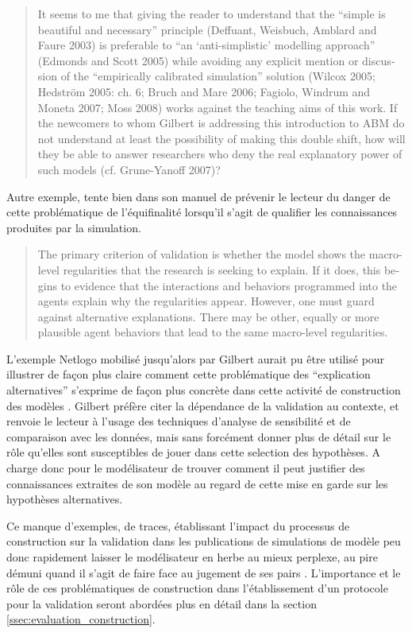 \foreignblockquote{english}[\cite{Manzo2007a}]{It seems to me that giving the reader to understand that the \enquote{simple is beautiful and necessary} principle (Deffuant, Weisbuch, Amblard and Faure 2003) is preferable to \enquote{an \enquote{anti-simplistic} modelling approach} (Edmonds and Scott 2005) while avoiding any explicit mention or discussion of the \enquote{empirically
calibrated simulation} solution (Wilcox 2005; Hedström 2005: ch. 6; Bruch and Mare 2006; Fagiolo, Windrum and Moneta 2007; Moss 2008) works against the teaching aims of this work. If the newcomers to whom Gilbert is addressing this introduction to ABM do not understand at least the possibility of making this double shift, how will they be able to answer researchers who deny the real explanatory power of such models (cf. Grune-Yanoff 2007)?}

Autre exemple, \textcite{Gilbert2008} tente bien dans son manuel de prévenir le lecteur du danger de cette problématique de l'équifinalité lorsqu'il s'agit de qualifier les connaissances produites par la simulation.

\foreignblockquote{english}[{\cite[31-32]{Gilbert2008}}]{The primary criterion of validation is whether the model shows the macro-level regularities that the research is seeking to explain. If it does, this begins to evidence that the interactions and behaviors programmed into the agents explain why the regularities appear. However, one must guard against alternative explanations. There may be other, equally or more plausible agent behaviors that lead to the same macro-level regularities.}

L'exemple Netlogo mobilisé jusqu'alors par Gilbert aurait pu être utilisé pour illustrer de façon plus claire comment cette problématique des \enquote{explication alternatives} s'exprime de façon plus concrète dans cette activité de construction des modèles . Gilbert préfère citer la dépendance de la validation au contexte, et renvoie le lecteur à l'usage des techniques d'analyse de sensibilité et de comparaison avec les données, mais sans forcément donner plus de détail sur le rôle qu'elles sont susceptibles de jouer dans cette selection des hypothèses. A charge donc pour le modélisateur de trouver comment il peut justifier des connaissances extraites de son modèle au regard de cette mise en garde sur les hypothèses alternatives. 

Ce manque d'exemples, de traces, établissant l'impact du processus de construction sur la validation dans les publications de simulations de modèle peu donc rapidement laisser le modélisateur en herbe au mieux perplexe, au pire démuni quand il s'agit de faire face au jugement de ses pairs \autocite{Manzo2007a}. L'importance et le rôle de ces problématiques de construction dans l'établissement d'un protocole pour la validation seront abordées plus en détail dans la section \ref{ssec:evaluation_construction}.

